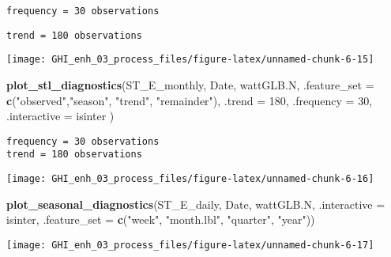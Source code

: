 \documentclass[
  10pt,
  a4paper,oneside]{article}
\newenvironment{Shaded}{\begin{snugshade}}{\end{snugshade}}
\newcommand{\AttributeTok}[1]{\textcolor[rgb]{0.13,0.29,0.53}{#1}}
\newcommand{\DecValTok}[1]{\textcolor[rgb]{0.00,0.00,0.81}{#1}}
\newcommand{\FunctionTok}[1]{\textcolor[rgb]{0.13,0.29,0.53}{\textbf{#1}}}
\newcommand{\NormalTok}[1]{#1}
\newcommand{\StringTok}[1]{\textcolor[rgb]{0.31,0.60,0.02}{#1}}
\begin{document}
\begin{verbatim}
frequency = 30 observations
\end{verbatim}

\begin{verbatim}
trend = 180 observations
\end{verbatim}

\begin{center}\texttt{[image: GHI\_enh\_03\_process\_files/figure-latex/unnamed-chunk-6-15]} \end{center}

\begin{Shaded}
\begin{Highlighting}[]
\FunctionTok{plot\_stl\_diagnostics}\NormalTok{(ST\_E\_monthly, Date, wattGLB.N,}
                     \AttributeTok{.feature\_set =} \FunctionTok{c}\NormalTok{(}\StringTok{"observed"}\NormalTok{,}\StringTok{"season"}\NormalTok{, }\StringTok{"trend"}\NormalTok{, }\StringTok{"remainder"}\NormalTok{),}
                     \AttributeTok{.trend =} \DecValTok{180}\NormalTok{,}
                     \AttributeTok{.frequency =} \DecValTok{30}\NormalTok{,}
                     \AttributeTok{.interactive =}\NormalTok{ isinter}
\NormalTok{                     )}
\end{Highlighting}
\end{Shaded}

\begin{verbatim}
frequency = 30 observations
trend = 180 observations
\end{verbatim}

\begin{center}\texttt{[image: GHI\_enh\_03\_process\_files/figure-latex/unnamed-chunk-6-16]} \end{center}

\begin{Shaded}
\begin{Highlighting}[]
\FunctionTok{plot\_seasonal\_diagnostics}\NormalTok{(ST\_E\_daily, Date, wattGLB.N, }\AttributeTok{.interactive =}\NormalTok{ isinter,}
                          \AttributeTok{.feature\_set =} \FunctionTok{c}\NormalTok{(}\StringTok{"week"}\NormalTok{, }\StringTok{"month.lbl"}\NormalTok{, }\StringTok{"quarter"}\NormalTok{, }\StringTok{"year"}\NormalTok{))}
\end{Highlighting}
\end{Shaded}

\begin{center}\texttt{[image: GHI\_enh\_03\_process\_files/figure-latex/unnamed-chunk-6-17]} \end{center}
\end{document}
